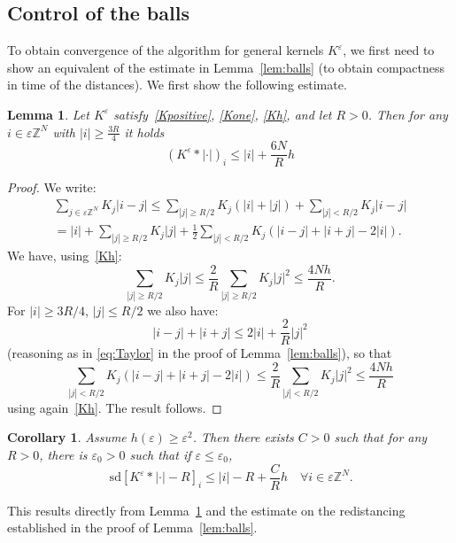 \documentclass[10pt]{amsart}
\theoremstyle{plain}
\newtheorem{lemma}[theorem]{Lemma}
\newtheorem{corollary}[theorem]{Corollary}
\theoremstyle{definition}
\newcommand{\Z}{\mathbb{Z}}
\newcommand{\e}{\varepsilon}
\newcommand{\sd}{\,\mathrm{sd}}
\numberwithin{equation}{section}
\begin{document}
\newcommand{\Ksd}{\mathcal{K}^\e}
\subsection{Control of the balls}\label{sec:balls2}
To obtain  convergence of the algorithm for  general kernels $K^\e$, we first need to show
an equivalent of the estimate in Lemma~\ref{lem:balls} (to obtain
compactness in time of the distances).
We first show the following estimate.
\begin{lemma}\label{lem:ballsKh}
  Let $K^\e$ satisfy~\eqref{Kpositive}, \eqref{Kone}, \eqref{Kh}, and let $R>0$.
  Then for any $i\in\e\Z^N$ with $|i|\ge \frac {3R}4$ it holds 
  \[
    (K^\e*|\cdot|)_i \le |i| + \frac{  {6}N}{R}h
  \]
\end{lemma}
\begin{proof}
  We write:
  \begin{multline*}
    \sum_{j\in\e\Z^N} K_j|i-j|  \le \sum_{|j|\ge R/2} K_j (|i|+|j|)+  \sum_{|j|< R/2} K_j |i-j|
    \\  = |i| +  \sum_{|j|\ge R/2} K_j|j| + \frac{1}{2}  \sum_{|j|< R/2} K_j (|i-j|+|i+j|-2|i|).
  \end{multline*}
  We have, using~\eqref{Kh}:
  \[
    \sum_{|j|\ge R/2} K_j|j|\le \frac{2}{R} \sum_{|j|\ge R/2} K_j|j|^2 \le \frac{4Nh}{R}.
  \]
  For $|i|\ge 3R/4$, $|j|\le R/2$ we also have:
  \[
    |i-j|+|i+j| \le 2|i|  + \frac{2}{R}|j|^2
  \]
  (reasoning as in \eqref{eq:Taylor} in  the proof of Lemma~\ref{lem:balls}), so that
  \[
    \sum_{|j|< R/2} K_j (|i-j|+|i+j|-2|i|) \le \frac{2}{R}\sum_{|j|<R/2} K_j|j|^2 \le \frac{4Nh}{R}
  \]
using again~\eqref{Kh}.  The result follows.
\end{proof}

\begin{corollary}\label{lem:balls2}
  Assume $h(\e)\ge \e^2$. Then there
  exists $C>0$ such that for any $R>0$, there is $\e_0>0$ such that if $\e\le\e_0$,
  \[
    \sd[K^\e*|\cdot|-R]_i \le |i|-R +\frac{C}{R} h\quad \forall i\in\e\Z^N. 
  \]
\end{corollary}
This results directly from Lemma~\ref{lem:ballsKh} and the estimate
on the redistancing established in the proof of Lemma~\ref{lem:balls}.
\end{document}
